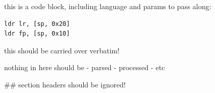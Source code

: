 
this is a code block, including language and params to pass along:

\begin{verbatim}
ldr lr, [sp, 0x20]
ldr fp, [sp, 0x10]
\end{verbatim}

this should be carried over verbatim!

nothing in here should be
- parsed
- processed
- etc

## section headers should be ignored!

